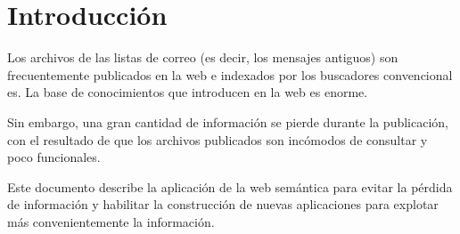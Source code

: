 
\section{Introducción}

Los archivos de las listas de correo (es decir, los mensajes antiguos) son
frecuentemente publicados en la web e indexados por los buscadores convencional
es. La base de conocimientos que introducen en la web es enorme.

Sin embargo, una gran cantidad de información se pierde durante la publicación,
con el resultado de que los archivos publicados son incómodos de consultar
y poco funcionales.

Este documento describe la aplicación de la web semántica para evitar la
pérdida de información y habilitar la construcción de nuevas aplicaciones
para explotar más convenientemente la información.
